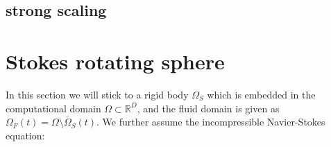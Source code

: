 \documentclass[a4paper,10pt]{report} %
\begin{document}
\subsection{strong scaling}

%		

%		


\section{Stokes rotating sphere}
In this section we will stick to a rigid body $\Omega_S$ which is embedded in the computational domain $\Omega \subset \mathbb{R}^D$, and the fluid domain is given as 
$\Omega_F(t)=\Omega \setminus \overline{\Omega}_S(t)$.
We further assume the incompressible Navier-Stokes equation:
\end{document}
